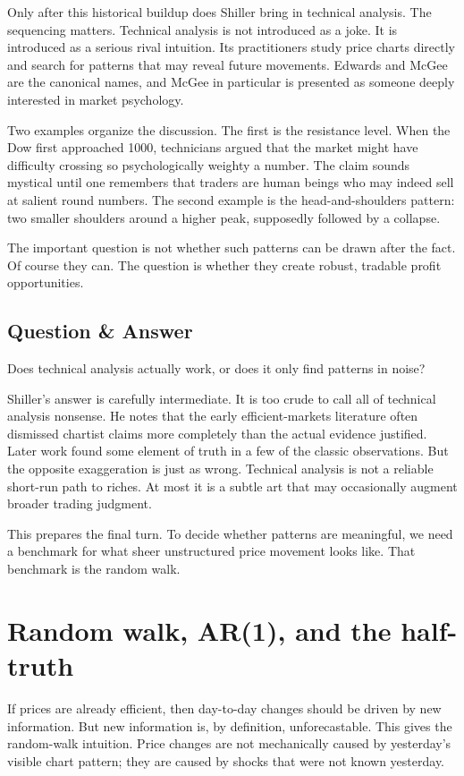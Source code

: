 Only after this historical buildup does Shiller bring in technical analysis. The sequencing matters. Technical analysis is not introduced as a joke. It is introduced as a serious rival intuition. Its practitioners study price charts directly and search for patterns that may reveal future movements. Edwards and McGee are the canonical names, and McGee in particular is presented as someone deeply interested in market psychology.

Two examples organize the discussion. The first is the resistance level. When the Dow first approached 1000, technicians argued that the market might have difficulty crossing so psychologically weighty a number. The claim sounds mystical until one remembers that traders are human beings who may indeed sell at salient round numbers. The second example is the head-and-shoulders pattern: two smaller shoulders around a higher peak, supposedly followed by a collapse.

The important question is not whether such patterns can be drawn after the fact. Of course they can. The question is whether they create robust, tradable profit opportunities.

\subsection{Question \& Answer}

Does technical analysis actually work, or does it only find patterns in noise?

Shiller's answer is carefully intermediate. It is too crude to call all of technical analysis nonsense. He notes that the early efficient-markets literature often dismissed chartist claims more completely than the actual evidence justified. Later work found some element of truth in a few of the classic observations. But the opposite exaggeration is just as wrong. Technical analysis is not a reliable short-run path to riches. At most it is a subtle art that may occasionally augment broader trading judgment.

This prepares the final turn. To decide whether patterns are meaningful, we need a benchmark for what sheer unstructured price movement looks like. That benchmark is the random walk.

\section{Random walk, AR(1), and the half-truth}

If prices are already efficient, then day-to-day changes should be driven by new information. But new information is, by definition, unforecastable. This gives the random-walk intuition. Price changes are not mechanically caused by yesterday's visible chart pattern; they are caused by shocks that were not known yesterday.

